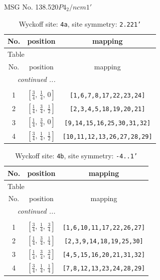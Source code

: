 \documentclass[fleqn,8pt]{jsarticle}
\begin{document}
\setcounter{MaxMatrixCols}{32}

\renewcommand{\tablename}{Table~}
\renewcommand{\figurename}{Figure~}
\begin{center}
\LARGE
MSG No. 138.520\quad$P4_{2}/ncm1'$
\end{center}
\renewcommand{\arraystretch}{1.2}
\begin{longtable}{ccc}
\caption{Wyckoff site: {\tt 4a}, site symmetry: {\tt 2.221'}}
 \\
 \hline \hline
No. & position & mapping \\ \hline \endfirsthead

\multicolumn{2}{l}{\tablename\ \thetable{}} \\
 \hline \hline
No. & position & mapping \\ \hline \endhead

 \hline \hline
\multicolumn{2}{r}{\footnotesize\it continued ...} \\ \endfoot

 \hline \hline
\multicolumn{2}{r}{} \\ \endlastfoot

1 & $\left[ \frac{3}{4},\, \frac{1}{4},\, 0 \right]$ & {\tt [1,6,7,8,17,22,23,24]} \\ \hline
2 & $\left[ \frac{1}{4},\, \frac{3}{4},\, \frac{1}{2} \right]$ & {\tt [2,3,4,5,18,19,20,21]} \\ \hline
3 & $\left[ \frac{1}{4},\, \frac{3}{4},\, 0 \right]$ & {\tt [9,14,15,16,25,30,31,32]} \\ \hline
4 & $\left[ \frac{3}{4},\, \frac{1}{4},\, \frac{1}{2} \right]$ & {\tt [10,11,12,13,26,27,28,29]} \\
\end{longtable}
\renewcommand{\arraystretch}{1.2}
\begin{longtable}{ccc}
\caption{Wyckoff site: {\tt 4b}, site symmetry: {\tt -4..1'}}
 \\
 \hline \hline
No. & position & mapping \\ \hline \endfirsthead

\multicolumn{2}{l}{\tablename\ \thetable{}} \\
 \hline \hline
No. & position & mapping \\ \hline \endhead

 \hline \hline
\multicolumn{2}{r}{\footnotesize\it continued ...} \\ \endfoot

 \hline \hline
\multicolumn{2}{r}{} \\ \endlastfoot

1 & $\left[ \frac{3}{4},\, \frac{1}{4},\, \frac{3}{4} \right]$ & {\tt [1,6,10,11,17,22,26,27]} \\ \hline
2 & $\left[ \frac{1}{4},\, \frac{3}{4},\, \frac{1}{4} \right]$ & {\tt [2,3,9,14,18,19,25,30]} \\ \hline
3 & $\left[ \frac{1}{4},\, \frac{3}{4},\, \frac{3}{4} \right]$ & {\tt [4,5,15,16,20,21,31,32]} \\ \hline
4 & $\left[ \frac{3}{4},\, \frac{1}{4},\, \frac{1}{4} \right]$ & {\tt [7,8,12,13,23,24,28,29]} \\
\end{longtable}
\end{document}
